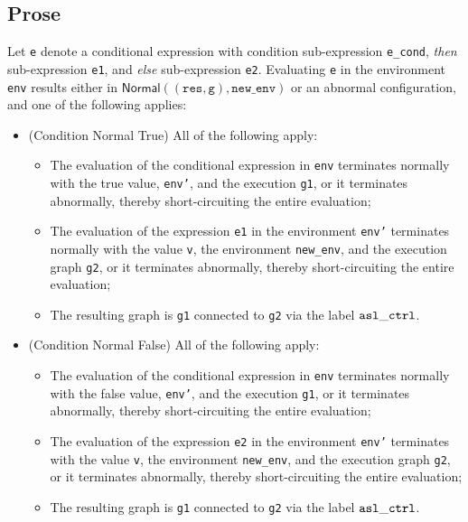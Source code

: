 \documentclass{book}
\newcommand\Normal[0]{\textsf{Normal}}
\newcommand\newenv[0]{\texttt{new\_env}}
\newcommand\vg[0]{\texttt{g}}
\newcommand\vres[0]{\texttt{res}}
\begin{document}
  \subsection{Prose}
  Let \texttt{e} denote a conditional expression with condition sub-expression \texttt{e\_cond},
  \textit{then} sub-expression \texttt{e1}, and \textit{else} sub-expression \texttt{e2}.
  Evaluating \texttt{e} in the environment \texttt{env} results either in $\Normal((\vres,\vg),\newenv)$
  or an abnormal configuration, and one of the following applies:
  \begin{itemize}
    \item (Condition Normal True) All of the following apply:
    \begin{itemize}
      \item The evaluation of the conditional expression in \texttt{env} terminates normally with the true value,
            \texttt{env'}, and the execution \texttt{g1}, or it terminates abnormally, thereby short-circuiting the entire evaluation;
      \item The evaluation of the expression \texttt{e1} in the environment \texttt{env'} terminates normally with the value
            \texttt{v}, the environment \texttt{new\_env}, and the execution graph \texttt{g2},
            or it terminates abnormally, thereby short-circuiting the entire evaluation;
      \item The resulting graph is \texttt{g1} connected to \texttt{g2} via the label $\mathtt{asl\_ctrl}$.
    \end{itemize}

    \item (Condition Normal False) All of the following apply:
    \begin{itemize}
      \item The evaluation of the conditional expression in \texttt{env} terminates normally with the false value,
            \texttt{env'}, and the execution \texttt{g1}, or it terminates abnormally, thereby short-circuiting the entire evaluation;
      \item The evaluation of the expression \texttt{e2} in the environment \texttt{env'} terminates with the value
            \texttt{v}, the environment \texttt{new\_env}, and the execution graph \texttt{g2},
            or it terminates abnormally, thereby short-circuiting the entire evaluation;
      \item The resulting graph is \texttt{g1} connected to \texttt{g2} via the label $\mathtt{asl\_ctrl}$.
    \end{itemize}
  \end{itemize}
\end{document}
